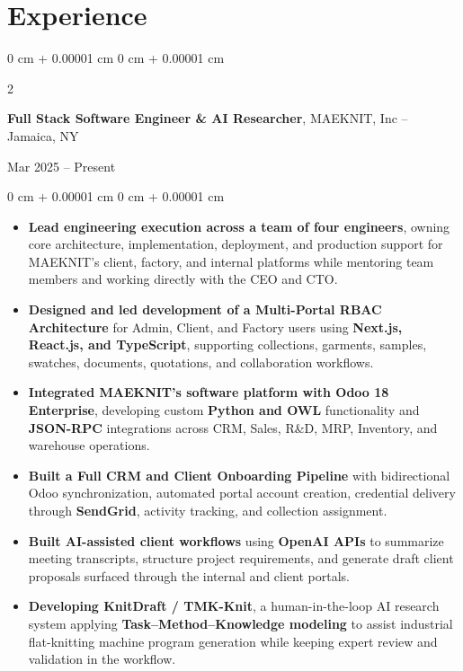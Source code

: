 \documentclass[10pt, letterpaper]{article}
\newenvironment{highlights}{
    \begin{itemize}[
        topsep=0.10 cm,
        parsep=0.10 cm,
        partopsep=0pt,
        itemsep=0pt,
        leftmargin=0 cm + 10pt
    ]
}{
    \end{itemize}
}
\newenvironment{onecolentry}{
    \begin{adjustwidth}{
        0 cm + 0.00001 cm
    }{
        0 cm + 0.00001 cm
    }
}{
    \end{adjustwidth}
}
\newenvironment{twocolentry}[2][]{
    \onecolentry
    \def\secondColumn{#2}
    \setcolumnwidth{\fill, 4.5 cm}
    \begin{paracol}{2}
}{
    \switchcolumn \raggedleft \secondColumn
    \end{paracol}
    \endonecolentry
}
\begin{document}
\section{Experience}

\begin{twocolentry}{Mar 2025 -- Present}
\textbf{Full Stack Software Engineer \& AI Researcher}, MAEKNIT, Inc -- Jamaica, NY
\end{twocolentry}

\vspace{0.1 cm}

\begin{onecolentry}
\begin{highlights}

\item \textbf{Lead engineering execution across a team of four engineers}, owning core architecture, implementation, deployment, and production support for MAEKNIT's client, factory, and internal platforms while mentoring team members and working directly with the CEO and CTO.

\item \textbf{Designed and led development of a Multi-Portal RBAC Architecture} for Admin, Client, and Factory users using \textbf{Next.js, React.js, and TypeScript}, supporting collections, garments, samples, swatches, documents, quotations, and collaboration workflows.

\item \textbf{Integrated MAEKNIT's software platform with Odoo 18 Enterprise}, developing custom \textbf{Python and OWL} functionality and \textbf{JSON-RPC} integrations across CRM, Sales, R\&D, MRP, Inventory, and warehouse operations.

\item \textbf{Built a Full CRM and Client Onboarding Pipeline} with bidirectional Odoo synchronization, automated portal account creation, credential delivery through \textbf{SendGrid}, activity tracking, and collection assignment.

\item \textbf{Built AI-assisted client workflows} using \textbf{OpenAI APIs} to summarize meeting transcripts, structure project requirements, and generate draft client proposals surfaced through the internal and client portals.

\item \textbf{Developing KnitDraft / TMK-Knit}, a human-in-the-loop AI research system applying \textbf{Task--Method--Knowledge modeling} to assist industrial flat-knitting machine program generation while keeping expert review and validation in the workflow.


\end{highlights}
\end{onecolentry}
\end{document}

